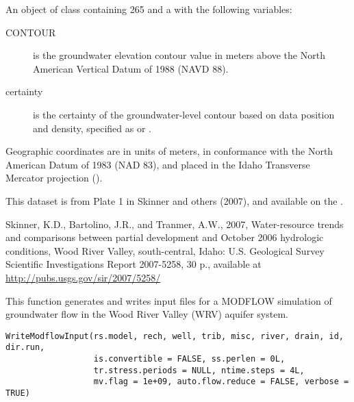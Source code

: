 \documentclass[letterpaper]{book}
\begin{document}
\begin{Format}
An object of  class containing 265  and a  with the following variables:
\begin{description}

\item[CONTOUR] is the groundwater elevation contour value in meters above the North American Vertical Datum of 1988 (NAVD 88).
\item[certainty] is the certainty of the groundwater-level contour based on data position and density, specified as  or .

\end{description}

Geographic coordinates are in units of meters, in conformance with the North American Datum of 1983 (NAD 83), and placed in the
Idaho Transverse Mercator projection ().
\end{Format}
%
\begin{Source}\relax
This dataset is from Plate 1 in Skinner and others (2007), and available on the .
\end{Source}
%
\begin{References}\relax
Skinner, K.D., Bartolino, J.R., and Tranmer, A.W., 2007, Water-resource trends and comparisons between partial development and October 2006 hydrologic conditions, Wood River Valley, south-central, Idaho: U.S. Geological Survey Scientific Investigations Report 2007-5258, 30 p., available at \url{http://pubs.usgs.gov/sir/2007/5258/}
\end{References}
%
\begin{Examples}
\end{Examples}
%
\begin{Description}\relax
This function generates and writes input files for a MODFLOW simulation of groundwater flow in the Wood River Valley (WRV) aquifer system.
\end{Description}
%
\begin{Usage}
\begin{verbatim}
WriteModflowInput(rs.model, rech, well, trib, misc, river, drain, id, dir.run,
                  is.convertible = FALSE, ss.perlen = 0L,
                  tr.stress.periods = NULL, ntime.steps = 4L,
                  mv.flag = 1e+09, auto.flow.reduce = FALSE, verbose = TRUE)
\end{verbatim}
\end{Usage}
\end{document}
